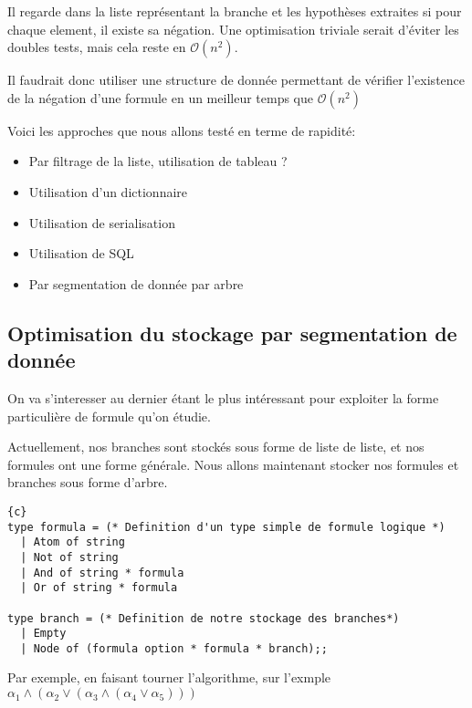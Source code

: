 \documentclass{paper}
\begin{document}
Il regarde dans la liste représentant la branche et les hypothèses extraites si pour chaque element, il existe sa négation. Une optimisation triviale serait d'éviter les doubles tests,
mais cela reste en $\mathcal{O}(n^2)$.

Il faudrait donc utiliser une structure de donnée permettant de vérifier l'existence de la négation d'une formule en un meilleur temps que $\mathcal{O}(n^2)$

Voici les approches que nous allons testé en terme de rapidité:

\begin{itemize}
    \item Par filtrage de la liste, utilisation de tableau ?
    \item Utilisation d'un dictionnaire
    \item Utilisation de serialisation
    \item Utilisation de SQL
    \item Par segmentation de donnée par arbre
\end{itemize}

\subsection{Optimisation du stockage par segmentation de donnée}

On va s'interesser au dernier étant le plus intéressant pour exploiter la forme particulière de formule qu'on étudie.

Actuellement, nos branches sont stockés sous forme de liste de liste, et nos formules ont une forme générale. Nous allons maintenant stocker nos formules et branches sous forme d'arbre.

\begin{lstlisting}{c}
type formula = (* Definition d'un type simple de formule logique *)
  | Atom of string
  | Not of string
  | And of string * formula
  | Or of string * formula

type branch = (* Definition de notre stockage des branches*)
  | Empty
  | Node of (formula option * formula * branch);;

\end{lstlisting}

Par exemple, en faisant tourner l'algorithme, sur l'exmple $\alpha_1\land(\alpha_2\lor(\alpha_3\land(\alpha_4\lor\alpha_5)))$ 

\end{document}
